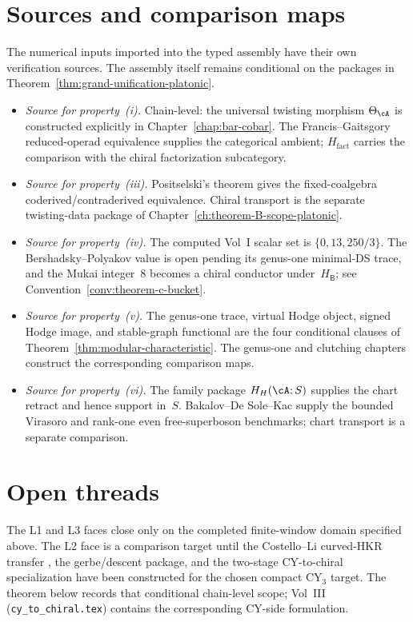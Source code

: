 \section{Sources and comparison maps}
\label{sec:grand-theorem-verification}

The numerical inputs imported into the typed assembly have their own
verification sources. The assembly itself remains conditional on the
packages in Theorem~\ref{thm:grand-unification-platonic}.
\begin{itemize}
\item \emph{Source for property~(i).} Chain-level: the
universal twisting morphism $\Theta_\cA$ is constructed explicitly
in Chapter~\ref{chap:bar-cobar}.
The Francis--Gaitsgory reduced-operad equivalence supplies the
categorical ambient; $H_{\mathrm{fact}}$ carries the comparison with
the chiral factorization subcategory.
\item \emph{Source for property~(iii).}  Positselski's theorem gives
the fixed-coalgebra coderived/contraderived equivalence.  Chiral
transport is the separate twisting-data package of
Chapter~\ref{ch:theorem-B-scope-platonic}.
\item \emph{Source for property~(iv).} The computed Vol~I scalar set
is $\{0,13,250/3\}$.  The Bershadsky--Polyakov value is open pending
its genus-one minimal-DS trace, and the Mukai integer~$8$ becomes a
chiral conductor under~$H_{\mathsf B}$; see
Convention~\ref{conv:theorem-c-bucket}.
\item \emph{Source for property~(v).}  The genus-one trace,
virtual Hodge object, signed Hodge image, and stable-graph functional
are the four conditional clauses of
Theorem~\ref{thm:modular-characteristic}.  The genus-one and clutching
chapters construct the corresponding comparison maps.
\item \emph{Source for property~(vi).}  The family package
$H_H(\cA;S)$ supplies the chart retract and hence support in~$S$.
Bakalov--De Sole--Kac supply the bounded Virasoro and rank-one even
free-superboson benchmarks; chart transport is a separate comparison.
\end{itemize}

\section{Open threads}
\label{sec:grand-theorem-open-threads}

The L1 and L3 faces close only on the completed finite-window domain
specified above. The L2 face is a comparison target until the
Costello--Li curved-HKR transfer \cite{CL20}, the gerbe/descent
package, and the two-stage CY-to-chiral specialization have been
constructed for the chosen compact CY$_3$ target. The theorem below
records that conditional chain-level scope; Vol~III
(\texttt{cy\_to\_chiral.tex}) contains the corresponding CY-side
formulation.

